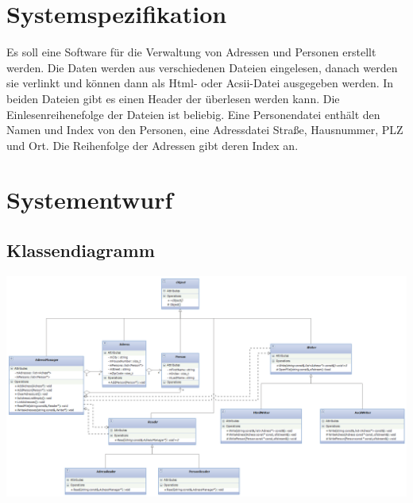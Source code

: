 \documentclass[12pt,a4paper]{article}
\begin{document}
\section{Systemspezifikation}
Es soll eine Software für die Verwaltung von Adressen und Personen erstellt werden. Die Daten werden aus verschiedenen Dateien eingelesen, danach werden sie verlinkt und können dann als Html- oder Acsii-Datei ausgegeben werden.
\newline
In beiden Dateien gibt es einen Header der überlesen werden kann. Die Einlesenreihenefolge der Dateien ist beliebig. Eine Personendatei enthält den Namen und Index von den Personen, eine Adressdatei Straße, Hausnummer, PLZ und Ort. Die Reihenfolge der Adressen gibt deren Index an.
 \\


\newpage
\section {Systementwurf}

\subsection {Klassendiagramm}

\includegraphics[angle=90,scale=0.6] {../Klassendiagramm.png}

\newpage
\end{document}
